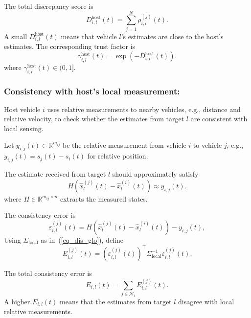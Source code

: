 \documentclass{ifacconf}
\def\eqref#1{(\ref{#1})}
\def\N{\mathcal{N}} %
\begin{document}
The total discrepancy score is
\begin{equation}
    D_{i,l}^{\text{host}}(t) = \sum_{j=1}^N \rho_{i,l}^{(j)}(t).
\end{equation}
A small $D_{i,l}^{\text{host}}(t)$ means that vehicle $l$'s estimates are close to the host's estimates. The corresponding trust factor is
\begin{equation}
    \gamma_{i,l}^{\text{host}}(t) = \exp\left( -D_{i,l}^{\text{host}}(t) \right).
\end{equation}
where $\gamma_{i,l}^{\text{host}}(t) \in (0, 1]$.


\subsubsection{Consistency with host's local measurement:}
Host vehicle $i$ uses relative measurements to nearby vehicles, e.g., distance and relative velocity, to check whether the estimates from target $l$ are consistent with local sensing.

Let $y_{i,j}(t) \in \mathbb{R}^{m_{ij}}$ be the relative measurement from vehicle $i$ to vehicle $j$, e.g., $y_{i,j}(t) = s_{j}(t) - s_{i}(t)$ for relative position.

The estimate received from target $l$ should approximately satisfy
\begin{equation*}
    H(\hat{x}_l^{(j)}(t) - \hat{x}_l^{(i)}(t)) \approx y_{i,j}(t).
\end{equation*}
where $H \in \mathbb{R}^{m_{ij} \times n}$ extracts the measured states.

The consistency error is
\begin{equation}
    \varepsilon_{i,l}^{(j)}(t) = H\left( \hat{x}_l^{(j)}(t) - \hat{x}_l^{(i)}(t) \right) - y_{i,j}(t), 
\end{equation}
Using $\Sigma_{\text{local}}$ as in~\eqref{eq_dis_glo}, define
\begin{equation}
    E_{i,l}^{(j)}(t) = (\varepsilon_{i,l}^{(j)}(t))^{\top} \Sigma_{\text{local}}^{-1} \varepsilon_{i,l}^{(j)}(t).
\end{equation}

The total consistency error is
\begin{equation} 
    E_{i,l}(t) = \sum_{j \in \N_i} E_{i,l}^{(j)}(t).
\end{equation}
A higher $E_{i,l}(t)$ means that the estimates from target $l$ disagree with local relative measurements.
\end{document}
